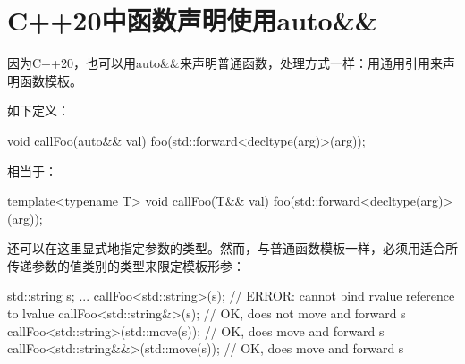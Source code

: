 \section{C++20中函数声明使用auto\&\&}
因为C++20，也可以用auto\&\&来声明普通函数，处理方式一样：用通用引用来声明函数模板。

如下定义：

\begin{cppcode}
void callFoo(auto&& val) {
	foo(std::forward<decltype(arg)>(arg));
}
\end{cppcode}

相当于：

\begin{cppcode}
template<typename T>
void callFoo(T&& val) {
	foo(std::forward<decltype(arg)>(arg));
}
\end{cppcode}

还可以在这里显式地指定参数的类型。然而，与普通函数模板一样，必须用适合所传递参数的值类别的类型来限定模板形参：

\begin{cppcode}
std::string s;
...
callFoo<std::string>(s); // ERROR: cannot bind rvalue reference to lvalue
callFoo<std::string&>(s); // OK, does not move and forward s
callFoo<std::string>(std::move(s)); // OK, does move and forward s
callFoo<std::string&&>(std::move(s)); // OK, does move and forward s
\end{cppcode}






































